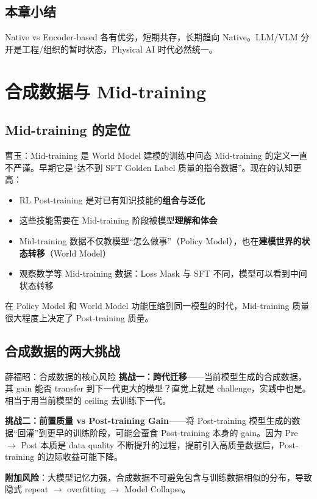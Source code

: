 \documentclass[a4paper]{article}
\begin{document}
\subsection{本章小结}
Native vs Encoder-based 各有优劣，短期共存，长期趋向 Native。LLM/VLM 分开是工程/组织的暂时状态，Physical AI 时代必然统一。

\section{合成数据与 Mid-training}

\subsection{Mid-training 的定位}

\begin{importantbox}{曹玉：Mid-training 是 World Model 建模的训练中间态}
Mid-training 的定义一直不严谨。早期它是``达不到 SFT Golden Label 质量的指令数据''。现在的认知更高：
\begin{itemize}
  \item RL Post-training 是对已有知识技能的\textbf{组合与泛化}
  \item 这些技能需要在 Mid-training 阶段被模型\textbf{理解和体会}
  \item Mid-training 数据不仅教模型``怎么做事''（Policy Model），也在\textbf{建模世界的状态转移}（World Model）
  \item 观察数学等 Mid-training 数据：Loss Mask 与 SFT 不同，模型可以看到中间状态转移
\end{itemize}
在 Policy Model 和 World Model 功能压缩到同一模型的时代，Mid-training 质量很大程度上决定了 Post-training 质量。
\end{importantbox}

\subsection{合成数据的两大挑战}

\begin{warningbox}{薛福昭：合成数据的核心风险}
\textbf{挑战一：跨代迁移}——当前模型生成的合成数据，其 gain 能否 transfer 到下一代更大的模型？直觉上就是 challenge，实践中也是。相当于用当前模型的 ceiling 去训练下一代。

\textbf{挑战二：前置质量 vs Post-training Gain}——将 Post-training 模型生成的数据``回灌''到更早的训练阶段，可能会蚕食 Post-training 本身的 gain。因为 Pre $\to$ Post 本质是 data quality 不断提升的过程，提前引入高质量数据后，Post-training 的边际收益可能下降。

\textbf{附加风险}：大模型记忆力强，合成数据不可避免包含与训练数据相似的分布，导致隐式 repeat $\to$ overfitting $\to$ Model Collapse。
\end{warningbox}
\end{document}
